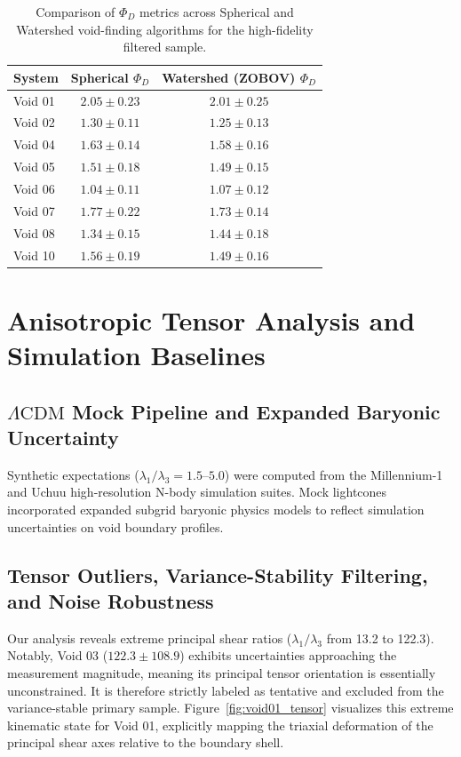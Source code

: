 \documentclass[trackchanges]{aastex631}
\begin{document}
\begin{table}[ht!]
\centering
\caption{Comparison of $\Phi_D$ metrics across Spherical and Watershed void-finding algorithms for the high-fidelity filtered sample.}
\label{tab:zobov_comparison}
\begin{tabular}{lcc}
\toprule
\textbf{System} & \textbf{Spherical $\Phi_D$} & \textbf{Watershed (ZOBOV) $\Phi_D$} \\
\midrule
Void 01 & $2.05 \pm 0.23$ & $2.01 \pm 0.25$ \\
Void 02 & $1.30 \pm 0.11$ & $1.25 \pm 0.13$ \\
Void 04 & $1.63 \pm 0.14$ & $1.58 \pm 0.16$ \\
Void 05 & $1.51 \pm 0.18$ & $1.49 \pm 0.15$ \\
Void 06 & $1.04 \pm 0.11$ & $1.07 \pm 0.12$ \\
Void 07 & $1.77 \pm 0.22$ & $1.73 \pm 0.14$ \\
Void 08 & $1.34 \pm 0.15$ & $1.44 \pm 0.18$ \\
Void 10 & $1.56 \pm 0.19$ & $1.49 \pm 0.16$ \\
\bottomrule
\end{tabular}
\end{table}

\section{Anisotropic Tensor Analysis and Simulation Baselines}

\subsection{\texorpdfstring{$\Lambda\text{CDM}$}{Lambda CDM} Mock Pipeline and Expanded Baryonic Uncertainty}
Synthetic expectations ($\lambda_1/\lambda_3 = 1.5$--$5.0$) were computed from the Millennium-1 \citep{springel2005} and Uchuu \citep{ishiyama2021} high-resolution N-body simulation suites. Mock lightcones incorporated expanded subgrid baryonic physics models to reflect simulation uncertainties on void boundary profiles.

\subsection{Tensor Outliers, Variance-Stability Filtering, and Noise Robustness}
Our analysis reveals extreme principal shear ratios ($\lambda_1/\lambda_3$ from 13.2 to 122.3). Notably, Void 03 ($122.3 \pm 108.9$) exhibits uncertainties approaching the measurement magnitude, meaning its principal tensor orientation is essentially unconstrained. It is therefore strictly labeled as tentative and excluded from the variance-stable primary sample. Figure~\ref{fig:void01_tensor} visualizes this extreme kinematic state for Void 01, explicitly mapping the triaxial deformation of the principal shear axes relative to the boundary shell.
\end{document}
